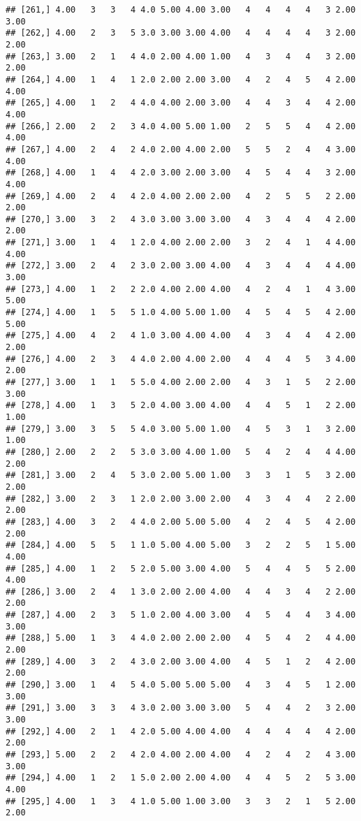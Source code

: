 \documentclass[]{article}
\begin{document}
\begin{verbatim}
## [261,] 4.00   3   3   4 4.0 5.00 4.00 3.00   4   4   4   4   3 2.00 3.00
## [262,] 4.00   2   3   5 3.0 3.00 3.00 4.00   4   4   4   4   3 2.00 2.00
## [263,] 3.00   2   1   4 4.0 2.00 4.00 1.00   4   3   4   4   3 2.00 2.00
## [264,] 4.00   1   4   1 2.0 2.00 2.00 3.00   4   2   4   5   4 2.00 4.00
## [265,] 4.00   1   2   4 4.0 4.00 2.00 3.00   4   4   3   4   4 2.00 4.00
## [266,] 2.00   2   2   3 4.0 4.00 5.00 1.00   2   5   5   4   4 2.00 4.00
## [267,] 4.00   2   4   2 4.0 2.00 4.00 2.00   5   5   2   4   4 3.00 4.00
## [268,] 4.00   1   4   4 2.0 3.00 2.00 3.00   4   5   4   4   3 2.00 4.00
## [269,] 4.00   2   4   4 2.0 4.00 2.00 2.00   4   2   5   5   2 2.00 2.00
## [270,] 3.00   3   2   4 3.0 3.00 3.00 3.00   4   3   4   4   4 2.00 2.00
## [271,] 3.00   1   4   1 2.0 4.00 2.00 2.00   3   2   4   1   4 4.00 4.00
## [272,] 3.00   2   4   2 3.0 2.00 3.00 4.00   4   3   4   4   4 4.00 3.00
## [273,] 4.00   1   2   2 2.0 4.00 2.00 4.00   4   2   4   1   4 3.00 5.00
## [274,] 4.00   1   5   5 1.0 4.00 5.00 1.00   4   5   4   5   4 2.00 5.00
## [275,] 4.00   4   2   4 1.0 3.00 4.00 4.00   4   3   4   4   4 2.00 2.00
## [276,] 4.00   2   3   4 4.0 2.00 4.00 2.00   4   4   4   5   3 4.00 2.00
## [277,] 3.00   1   1   5 5.0 4.00 2.00 2.00   4   3   1   5   2 2.00 3.00
## [278,] 4.00   1   3   5 2.0 4.00 3.00 4.00   4   4   5   1   2 2.00 1.00
## [279,] 3.00   3   5   5 4.0 3.00 5.00 1.00   4   5   3   1   3 2.00 1.00
## [280,] 2.00   2   2   5 3.0 3.00 4.00 1.00   5   4   2   4   4 4.00 2.00
## [281,] 3.00   2   4   5 3.0 2.00 5.00 1.00   3   3   1   5   3 2.00 2.00
## [282,] 3.00   2   3   1 2.0 2.00 3.00 2.00   4   3   4   4   2 2.00 2.00
## [283,] 4.00   3   2   4 4.0 2.00 5.00 5.00   4   2   4   5   4 2.00 2.00
## [284,] 4.00   5   5   1 1.0 5.00 4.00 5.00   3   2   2   5   1 5.00 4.00
## [285,] 4.00   1   2   5 2.0 5.00 3.00 4.00   5   4   4   5   5 2.00 4.00
## [286,] 3.00   2   4   1 3.0 2.00 2.00 4.00   4   4   3   4   2 2.00 2.00
## [287,] 4.00   2   3   5 1.0 2.00 4.00 3.00   4   5   4   4   3 4.00 3.00
## [288,] 5.00   1   3   4 4.0 2.00 2.00 2.00   4   5   4   2   4 4.00 2.00
## [289,] 4.00   3   2   4 3.0 2.00 3.00 4.00   4   5   1   2   4 2.00 2.00
## [290,] 3.00   1   4   5 4.0 5.00 5.00 5.00   4   3   4   5   1 2.00 3.00
## [291,] 3.00   3   3   4 3.0 2.00 3.00 3.00   5   4   4   2   3 2.00 3.00
## [292,] 4.00   2   1   4 2.0 5.00 4.00 4.00   4   4   4   4   4 2.00 2.00
## [293,] 5.00   2   2   4 2.0 4.00 2.00 4.00   4   2   4   2   4 3.00 3.00
## [294,] 4.00   1   2   1 5.0 2.00 2.00 4.00   4   4   5   2   5 3.00 4.00
## [295,] 4.00   1   3   4 1.0 5.00 1.00 3.00   3   3   2   1   5 2.00 2.00

\end{verbatim}
\end{document}
